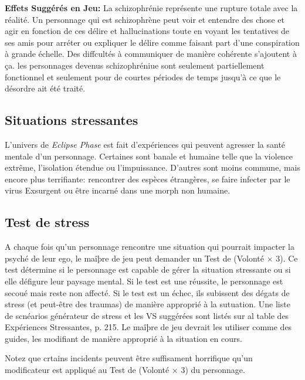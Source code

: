 \textbf{Effets Suggérés en Jeu:} La schizophrénie représente une rupture totale avec la réalité. Un personnage qui est schizophrène peut voir et entendre des chose et agir en fonction de ces délire et hallucinations toute en voyant les tentatives de ses amis pour arréter ou expliquer le délire comme faisant part d'une conspiration à grande échelle. Des diffcultés à communiquer de manière cohérente s'ajoutent à ça. les personnages devenus schizophréniue sont seulement partiellement fonctionnel et seulement pour de courtes périodes de temps jusqu'à ce que le désordre ait été traité. 

\subsection{Situations stressantes} \label{sec:stressful-situations} 

L'univers de \emph{Eclipse Phase } est fait d'expériences qui peuvent agresser la santé mentale d'un personnage. Certaines sont banale et humaine telle que la violence extrême, l'isolation étendue ou l'impuissance. D'autres sont moins commune, mais encore plus terrifiante: rencontrer des espèces étrangères, se faire infecter par le virus Exsurgent ou être incarné dans une morph non humaine. 

\subsection{Test de stress} \label{sec:willpower-stress-tests} 

A chaque fois qu'un personnage rencontre une situation qui pourrait impacter la psyché de leur ego, le maîþre de jeu peut demander un Test de (Volonté $\times$ 3). Ce test détermine si le personnage est capable de gérer la situation stressante ou si elle défigure leur paysage mental. Si le test est une réussite, le personnage est secoué mais reste non affecté. Si le test est un échec, ils subissent des dégats de stress (et peut-être des traumas) de manière approprié à la sutuation. Une liste de scnéarios générateur de stress et les VS suggérées sont listés sur al table des Expériences Stressantes, p. 215. Le maîþre de jeu devrait les utiliser comme des guides, les modifiant de manière approprié à la situation en cours. 

Notez que crtains incidents peuvent être suffisament horrifique qu'un modificateur est appliqué au Test de (Volonté $\times$ 3) du personnage. 

